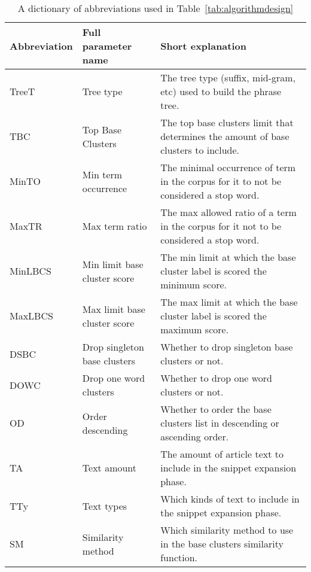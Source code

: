 \begin{landscape}
\begin{table}
\begin{center}
	\begin{tabular}{|l|l|l|}
	\hline
	Abbreviation & Full parameter name & Short explanation\\
	\hline
	TreeT & Tree type & The tree type (suffix, mid-gram, etc) used to build the phrase tree.\\
	TBC & Top Base Clusters & The top base clusters limit that determines the amount of base clusters to include.\\
	MinTO & Min term occurrence & The minimal occurrence of term in the corpus for it to not be considered a stop word.\\
	MaxTR & Max term ratio & The max allowed ratio of a term in the corpus for it not to be considered a stop word.\\
	MinLBCS & Min limit base cluster score & The min limit at which the base cluster label is scored the minimum score.\\
	MaxLBCS & Max limit base cluster score & The max limit at which the base cluster label is scored the maximum score.\\
	DSBC & Drop singleton base clusters & Whether to drop singleton base clusters or not.\\
	DOWC & Drop one word clusters & Whether to drop one word clusters or not.\\
	OD & Order descending & Whether to order the base clusters list in descending or ascending order.\\
	TA & Text amount & The amount of article text to include in the snippet expansion phase.\\
	TTy & Text types & Which kinds of text to include in the snippet expansion phase.\\
	SM & Similarity method & Which similarity method to use in the base clusters similarity function.\\
	\hline
	\end{tabular}
	\caption{A dictionary of abbreviations used in Table~\ref{tab:algorithmdesign}}
	\label{tab:parameterabbreviationdictionary}
\end{center}
\end{table}
\end{landscape}

